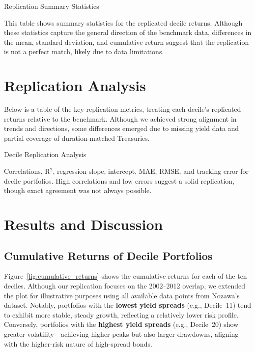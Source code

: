 \documentclass[12pt]{article}
\begin{document}
\begin{table}[htbp]
\centering
\caption{Replication Summary Statistics}
{\footnotesize
\renewcommand{\arraystretch}{0.9}
\resizebox{\textwidth}{!}{%
  
}
}
\caption*{\footnotesize This table shows summary statistics for the replicated decile returns. Although these statistics capture the general direction of the benchmark data, differences in the mean, standard deviation, and cumulative return suggest that the replication is not a perfect match, likely due to data limitations.}
\label{table:replicate_summary}
\end{table}

\section{Replication Analysis}
Below is a table of the key replication metrics, treating each decile’s replicated returns relative to the benchmark. Although we achieved strong alignment in trends and directions, some differences emerged due to missing yield data and partial coverage of duration-matched Treasuries.

\begin{table}[htbp]
\centering
\caption{Decile Replication Analysis}
\resizebox{\textwidth}{!}{%
  
}
\caption*{\footnotesize Correlations, R$^2$, regression slope, intercept, MAE, RMSE, and tracking error for decile portfolios. High correlations and low errors suggest a solid replication, though exact agreement was not always possible.}
\label{table:analysis}
\end{table}

\section{Results and Discussion}
\subsection{Cumulative Returns of Decile Portfolios}
Figure~\ref{fig:cumulative_returns} shows the cumulative returns for each of the ten deciles. Although our replication focuses on the 2002--2012 overlap, we extended the plot for illustrative purposes using all available data points from Nozawa’s dataset. Notably, portfolios with the \textbf{lowest yield spreads} (e.g., Decile~11) tend to exhibit more stable, steady growth, reflecting a relatively lower risk profile. Conversely, portfolios with the \textbf{highest yield spreads} (e.g., Decile~20) show greater volatility—achieving higher peaks but also larger drawdowns, aligning with the higher-risk nature of high-spread bonds.
\end{document}
